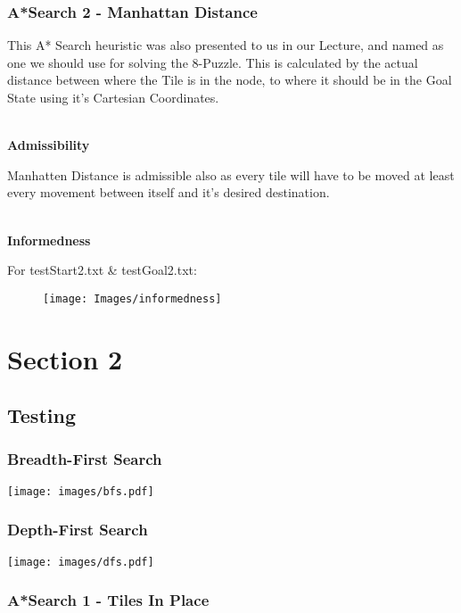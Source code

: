 \documentclass[11pt]{article} %
\begin{document}
			\subsubsection{A*Search 2 - Manhattan Distance}

				This A* Search heuristic was also presented to us in our Lecture, and named as one we should use for solving the 8-Puzzle. This is calculated by the actual distance between where the Tile is in the node, to where it should be in the Goal State using it's Cartesian Coordinates.

				\setlength{\parindent}{0pt} %
				\hspace{0pt} \\
				\textbf{Admissibility}

				Manhatten Distance is admissible also as every tile will have to be moved at least every movement between itself and it's desired destination.
					
				\hspace{0pt} \\
				\textbf{Informedness}
	
				For testStart2.txt \& testGoal2.txt:
					\begin{figure}[ht!]
					\centering
					\texttt{[image: Images/informedness]}
					\label{overflow}
					\end{figure} 
	
	\newpage
		\section{Section 2}
	
			\subsection{Testing}
			

				\subsubsection{Breadth-First Search}
					\texttt{[image: images/bfs.pdf]}
	
				\subsubsection{Depth-First Search}

					\texttt{[image: images/dfs.pdf]}
	
				\subsubsection{A*Search 1 - Tiles In Place}
\end{document}
